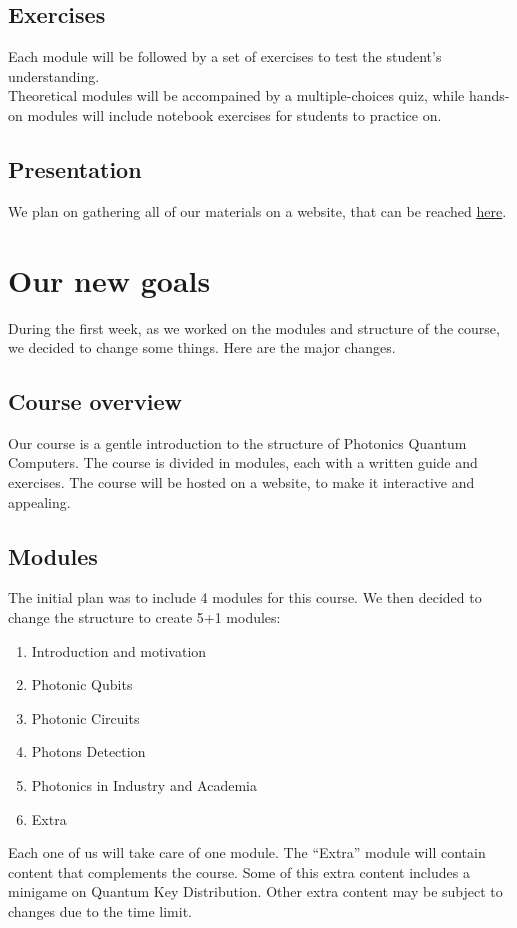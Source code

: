 \documentclass[hidelinks, a4paper,12pt]{article}
\begin{document}
\subsection{Exercises}
Each module will be followed by a set of exercises to test the student's understanding.\\ Theoretical modules will be accompained by a multiple-choices quiz, while hands-on modules will include notebook exercises for students to practice on.

\subsection{Presentation}
We plan on gathering all of our materials on a website, that can be reached \href{https://cosmcif.github.io/photonics-qworld-challenge/index.html}{\underline{here}}.
\newpage
\section{Our new goals}
During the first week, as we worked on the modules and structure of the course, we decided to change some things. Here are the major changes.
\subsection{Course overview}
Our course is a gentle introduction to the structure of Photonics Quantum Computers. The course is divided in modules, each with a written guide and exercises. The course will be hosted on a website, to make it interactive and appealing.
\subsection{Modules}
The initial plan was to include 4 modules for this course. We then decided to change the structure to create 5+1 modules:
\begin{enumerate}
  \item Introduction and motivation
  \item Photonic Qubits
  \item Photonic Circuits
  \item Photons Detection
  \item Photonics in Industry and Academia
  \item Extra
\end{enumerate}
Each one of us will take care of one module. The ``Extra'' module will contain content that complements the course. Some of this extra content includes a minigame on Quantum Key Distribution. Other extra content may be subject to changes due to the time limit.
\end{document}
